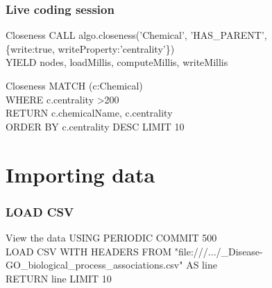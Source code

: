 \documentclass[12pt]{beamer}
\begin{document}
    \begin{frame}
        \frametitle{Live coding session}
        \begin{block}{Closeness}
            CALL algo.closeness('Chemical', 'HAS\_PARENT',\\
            \hspace{1cm} \{write:true, writeProperty:'centrality'\})\\
            YIELD nodes, loadMillis, computeMillis, writeMillis
        \end{block}
        
        \begin{block}{Closeness}
            MATCH (c:Chemical)\\
            \hspace{1cm} WHERE c.centrality \textgreater 200\\
            RETURN c.chemicalName, c.centrality\\
            \hspace{1cm} ORDER BY c.centrality DESC LIMIT 10
        \end{block}
    \end{frame}
   
    \section{Importing data}
    \begin{frame}
        \frametitle{LOAD CSV}
        \begin{block}{View the data}
            USING PERIODIC COMMIT 500\\
            LOAD CSV WITH HEADERS FROM "file:///.../\_Disease-GO\_biological\_process\_associations.csv" AS line\\
            RETURN line LIMIT 10
        \end{block}
    \end{frame}
    
\end{document}
